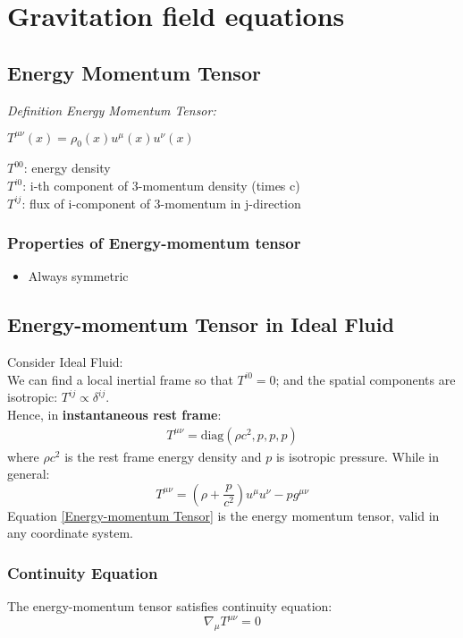 \documentclass[12pt,a4paper]{article}
\newcommand{\definition}[3]
    {
    \textit{Definition #1: }
    \begin{center}
        {#2}
    \end{center}
    {#3}\\
    }
\begin{document}
\section{Gravitation field equations}
    \subsection{Energy Momentum Tensor}
    \definition{Energy Momentum Tensor}
        {$T^{\mu\nu}(x)=\rho_0(x) u^\mu(x) u^\nu(x)$}
        {
        $T^{00}$: energy density\\
        $T^{i0}$: i-th component of 3-momentum density (times c)\\
        $T^{ij}$: flux of i-component of 3-momentum in j-direction
        }
    \subsubsection{Properties of Energy-momentum tensor}
    \begin{itemize}
        \item Always symmetric
    \end{itemize}
    \subsection{Energy-momentum Tensor in Ideal Fluid}
        Consider Ideal Fluid:\\
        We can find a local inertial frame so that $T^{i0}=0$; and the spatial components are isotropic: $T^{ij}\propto\delta^{ij}$.\\
        Hence, in \textbf{instantaneous rest frame}:
        \begin{align*}
            T^{\mu\nu}= \text{diag}(\rho c^2,p,p,p)
        \end{align*}
        where $\rho c^2$ is the rest frame energy density and $p$ is isotropic pressure.
        While in general:
        \begin{equation}\label{Energy-momentum Tensor}
            T^{\mu\nu}= (\rho+\dfrac{p}{c^2})u^\mu u^\nu - pg^{\mu\nu}
        \end{equation}
        Equation \ref{Energy-momentum Tensor} is the energy momentum tensor, valid in any coordinate system.\\
        \subsubsection{Continuity Equation}
        The energy-momentum tensor satisfies continuity equation:
        \begin{equation*}
            \nabla_\mu T^{\mu\nu} = 0
        \end{equation*}
\end{document}

